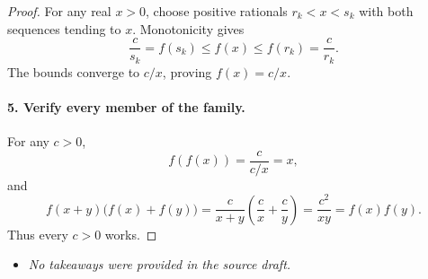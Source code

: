 \begin{dlsummary}[title={\bfseries Solution 54. The Harmonic Involution},breakable]
\begin{proof}
For any real \(x>0\), choose positive rationals \(r_k<x<s_k\) with both sequences tending to \(x\). Monotonicity gives
\[
\frac{c}{s_k}=f(s_k)\le f(x)\le f(r_k)=\frac{c}{r_k}.
\]
The bounds converge to \(c/x\), proving \(f(x)=c/x\).

\paragraph{5. Verify every member of the family.}

For any \(c>0\),
\[
f(f(x))=\frac{c}{c/x}=x,
\]
and
\[
f(x+y)\bigl(f(x)+f(y)\bigr)
=\frac{c}{x+y}\left(\frac cx+\frac cy\right)
=\frac{c^2}{xy}
=f(x)f(y).
\]
Thus every \(c>0\) works.
\end{proof}
\end{dlsummary}

\begin{takeaways}
\begin{itemize}
\item \emph{No takeaways were provided in the source draft.}
\end{itemize}
\end{takeaways}
